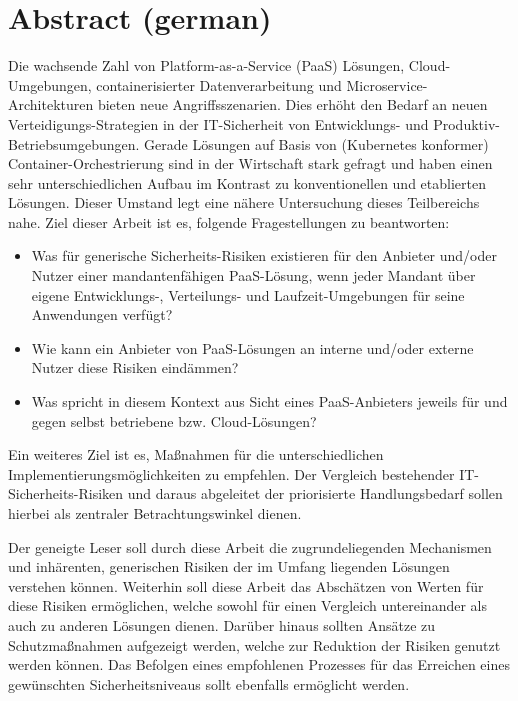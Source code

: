 \chapter*{Abstract (german)}
\thispagestyle{empty}
Die wachsende Zahl von Platform-as-a-Service (PaaS) Lösungen, Cloud-Umgebungen, containerisierter Datenverarbeitung und Microservice-Architekturen bieten neue Angriffsszenarien.
Dies erhöht den Bedarf an neuen Verteidigungs-Strategien in der IT-Sicherheit von Entwicklungs- und Produktiv-Betriebsumgebungen.
Gerade Lösungen auf Basis von (Kubernetes konformer) Container-Orchestrierung sind in der Wirtschaft stark gefragt und haben einen sehr unterschiedlichen Aufbau im Kontrast zu konventionellen und etablierten Lösungen.
Dieser Umstand legt eine nähere Untersuchung dieses Teilbereichs nahe.
Ziel dieser Arbeit ist es, folgende Fragestellungen zu beantworten:

\begin{itemize}

\item Was für generische Sicherheits-Risiken existieren für den Anbieter und/oder Nutzer einer mandantenfähigen PaaS-Lösung, wenn jeder Mandant über eigene Entwicklungs-, Verteilungs- und Laufzeit-Umgebungen für seine Anwendungen verfügt?

\item Wie kann ein Anbieter von PaaS-Lösungen an interne und/oder externe Nutzer diese Risiken eindämmen?

\item Was spricht in diesem Kontext aus Sicht eines PaaS-Anbieters jeweils für und gegen selbst betriebene bzw. Cloud-Lösungen?

\end{itemize}

Ein weiteres Ziel ist es, Maßnahmen für die unterschiedlichen Implementierungsmöglichkeiten zu empfehlen.
Der Vergleich bestehender IT-Sicherheits-Risiken und daraus abgeleitet der priorisierte Handlungsbedarf sollen hierbei als zentraler Betrachtungswinkel dienen.

Der geneigte Leser soll durch diese Arbeit die zugrundeliegenden Mechanismen und inhärenten, generischen Risiken der im Umfang liegenden Lösungen verstehen können.
Weiterhin soll diese Arbeit das Abschätzen von Werten für diese Risiken ermöglichen, welche sowohl für einen Vergleich untereinander als auch zu anderen Lösungen dienen. Darüber hinaus sollten Ansätze zu Schutzmaßnahmen aufgezeigt werden, welche zur Reduktion der Risiken genutzt werden können. Das Befolgen eines empfohlenen Prozesses für das Erreichen eines gewünschten Sicherheitsniveaus sollt ebenfalls ermöglicht werden.


